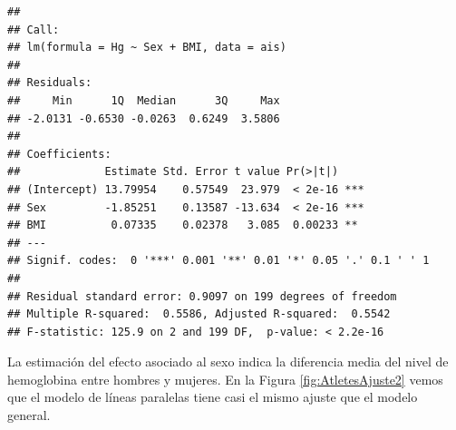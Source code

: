 \documentclass[
]{article}
\begin{document}
\begin{verbatim}
## 
## Call:
## lm(formula = Hg ~ Sex + BMI, data = ais)
## 
## Residuals:
##     Min      1Q  Median      3Q     Max 
## -2.0131 -0.6530 -0.0263  0.6249  3.5806 
## 
## Coefficients:
##             Estimate Std. Error t value Pr(>|t|)    
## (Intercept) 13.79954    0.57549  23.979  < 2e-16 ***
## Sex         -1.85251    0.13587 -13.634  < 2e-16 ***
## BMI          0.07335    0.02378   3.085  0.00233 ** 
## ---
## Signif. codes:  0 '***' 0.001 '**' 0.01 '*' 0.05 '.' 0.1 ' ' 1
## 
## Residual standard error: 0.9097 on 199 degrees of freedom
## Multiple R-squared:  0.5586, Adjusted R-squared:  0.5542 
## F-statistic: 125.9 on 2 and 199 DF,  p-value: < 2.2e-16
\end{verbatim}

La estimación del efecto asociado al sexo indica la diferencia media del nivel de hemoglobina entre hombres y mujeres. En la Figura \ref{fig:AtletesAjuste2} vemos que el modelo de líneas paralelas tiene casi el mismo ajuste que el modelo general.
\end{document}
